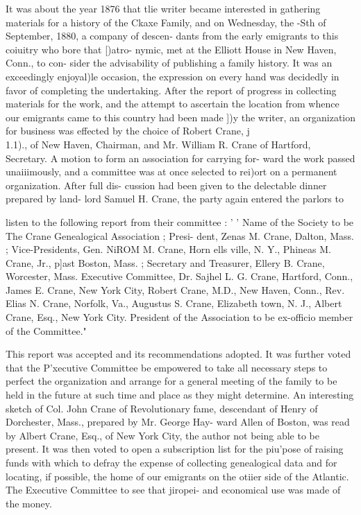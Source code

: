 \documentclass[oneside]{book}
\begin{document}
It was about the year 1876 that tlie writer became interested 
in gathering materials for a history of the Ckaxe Family, and 
on Wednesday, the -Sth of September, 1880, a company of descen- 
dants from the early emigrants to this coiuitry who bore that [)atro- 
nymic, met at the Elliott House in New Haven, Conn., to con- 
sider the advisability of publishing a family history. It was an 
exceedingly enjoyal)le occasion, the expression on every hand was 
decidedly in favor of completing the undertaking. After the 
report of progress in collecting materials for the work, and the 
attempt to ascertain the location from whence our emigrants came 
to this country had been made ])y the writer, an organization for 
business was effected by the choice of Robert Crane, j\\1.1)., of 
New Haven, Chairman, and Mr. William R. Crane of Hartford, 
Secretary. A motion to form an association for carrying for- 
ward the work passed unaiiimously, and a committee was at once 
selected to rei)ort on a permanent organization. After full dis- 
cussion had been given to the delectable dinner prepared by land- 
lord Samuel H. Crane, the party again entered the parlors to 



listen to the following report from their committee : ' ' Name of 
the Society to be The Crane Genealogical Association ; Presi- 
dent, Zenas M. Crane, Dalton, Mass. ; Vice-Presidents, Gen. 
NiROM M. Crane, Horn ells ville, N. Y., Phineas M. Crane, Jr., 
p]ast Boston, Mass. ; Secretary and Treasurer, Ellery B. 
Crane, Worcester, Mass. Executive Committee, Dr. Sajhel 
L. G. Crane, Hartford, Conn., James E. Crane, New York 
City, Robert Crane, M.D., New Haven, Conn., Rev. Elias N. 
Crane, Norfolk, Va., Augustus S. Crane, Elizabeth town, N. 
J., Albert Crane, Esq., New York City. President of the 
Association to be ex-officio member of the Committee." 

This report was accepted and its recommendations adopted. 
It was further voted that the P'xecutive Committee be empowered 
to take all necessary steps to perfect the organization and arrange 
for a general meeting of the family to be held in the future at 
such time and place as they might determine. An interesting 
sketch of Col. John Crane of Revolutionary fame, descendant 
of Henry of Dorchester, Mass., prepared by Mr. George Hay- 
ward Allen of Boston, was read by Albert Crane, Esq., of New 
York City, the author not being able to be present. It was then 
voted to open a subscription list for the piu'pose of raising funds 
with which to defray the expense of collecting genealogical data 
and for locating, if possible, the home of our emigrants on the 
otiier side of the Atlantic. The Executive Committee to see that 
jiropei- and economical use was made of the money. 
\end{document}
